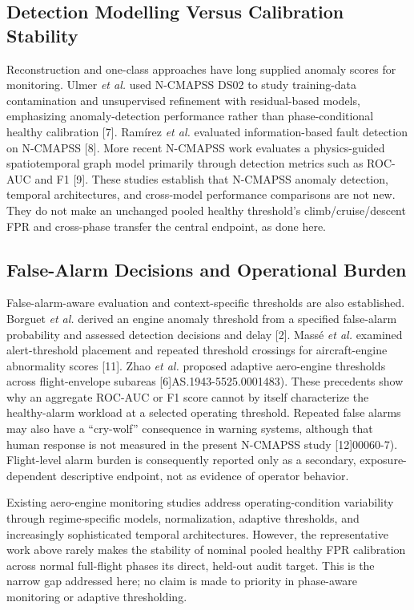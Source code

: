 \documentclass[10pt,conference]{IEEEtran}
\begin{document}
\subsection{Detection Modelling Versus Calibration Stability}\label{detection-modelling-versus-calibration-stability}

Reconstruction and one-class approaches have long supplied anomaly scores for monitoring. Ulmer \emph{et al.} used N-CMAPSS DS02 to study training-data contamination and unsupervised refinement with residual-based models, emphasizing anomaly-detection performance rather than phase-conditional healthy calibration {[}7{]}. Ramírez \emph{et al.} evaluated information-based fault detection on N-CMAPSS {[}8{]}. More recent N-CMAPSS work evaluates a physics-guided spatiotemporal graph model primarily through detection metrics such as ROC-AUC and F1 {[}9{]}. These studies establish that N-CMAPSS anomaly detection, temporal architectures, and cross-model performance comparisons are not new. They do not make an unchanged pooled healthy threshold's climb/cruise/descent FPR and cross-phase transfer the central endpoint, as done here.

\subsection{False-Alarm Decisions and Operational Burden}\label{false-alarm-decisions-and-operational-burden}

False-alarm-aware evaluation and context-specific thresholds are also established. Borguet \emph{et al.} derived an engine anomaly threshold from a specified false-alarm probability and assessed detection decisions and delay {[}2{]}. Massé \emph{et al.} examined alert-threshold placement and repeated threshold crossings for aircraft-engine abnormality scores {[}11{]}. Zhao \emph{et al.} proposed adaptive aero-engine thresholds across flight-envelope subareas {[}6{]}AS.1943-5525.0001483). These precedents show why an aggregate ROC-AUC or F1 score cannot by itself characterize the healthy-alarm workload at a selected operating threshold. Repeated false alarms may also have a ``cry-wolf'' consequence in warning systems, although that human response is not measured in the present N-CMAPSS study {[}12{]}00060-7). Flight-level alarm burden is consequently reported only as a secondary, exposure-dependent descriptive endpoint, not as evidence of operator behavior.

Existing aero-engine monitoring studies address operating-condition variability through regime-specific models, normalization, adaptive thresholds, and increasingly sophisticated temporal architectures. However, the representative work above rarely makes the stability of nominal pooled healthy FPR calibration across normal full-flight phases its direct, held-out audit target. This is the narrow gap addressed here; no claim is made to priority in phase-aware monitoring or adaptive thresholding.
\end{document}
